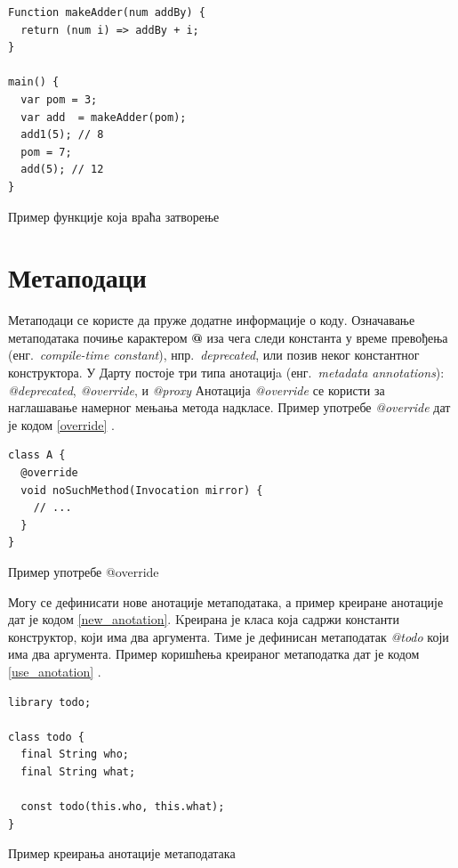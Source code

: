 \documentclass[12pt,oneside]{memoir}
\begin{document}
\begin{listing}
\begin{verbatim}
Function makeAdder(num addBy) {
  return (num i) => addBy + i;
}

main() {
  var pom = 3;
  var add  = makeAdder(pom);
  add1(5); // 8
  pom = 7;
  add(5); // 12
}
\end{verbatim}
\caption{Пример функције која враћа затворење}
\label{closure}
\end{listing}
\section{Метаподаци}
\label{metapodaci}
Метаподаци се користе да пруже додатне информације о коду. Означавање метаподатака почиње карактером \textbf{@} иза чега следи константа у време превођења (енг.~\textit{compile-time constant}), нпр.~\textit{deprecated}, или позив неког константног конструктора. 
У Дарту постоје три типа анотацијa (енг.~\textit{metadata annotations}): \textit{@deprecated}, \textit{@override}, и \textit{@proxy}
Анотација \textit{@override} се користи за наглашавање намерног мењања метода надкласе. Пример употребе \textit{@override} дат је кодом \ref{override} \cite{dart, dart1}. 

\begin{listing}
\begin{verbatim}
class A {
  @override
  void noSuchMethod(Invocation mirror) {
    // ...
  }
}
\end{verbatim}
\caption{Пример употребе @override}
\label{override}
\end{listing}

Могу се дефинисати нове анотације метаподатака, а пример креиране анотације дат је кодом \ref{new_anotation}. Kреирана је класа која садржи константи конструктор, који има два аргумента. Тиме је дефинисан метаподатак \textit{@todo} који има два аргумента. Пример коришћења креираног метаподатка дат је кодом \ref{use_anotation} \cite{dart, dart1}.

\begin{listing}
\begin{verbatim}
library todo;

class todo {
  final String who;
  final String what;

  const todo(this.who, this.what);
}
\end{verbatim}
\caption{Пример креирања анотације метаподатака}
\label{new_anotation}
\end{listing}
\end{document}
